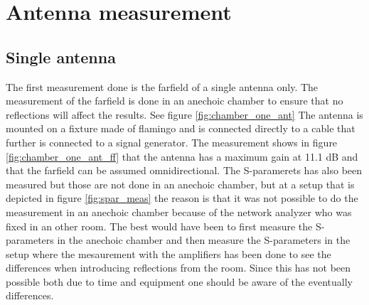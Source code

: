 \chapter{Antenna measurement}

\section{Single antenna}
The first measurement done is the farfield of a single antenna only. The measurement  of the farfield is done in an anechoic chamber to ensure that no reflections will affect the results. See figure \ref{fig:chamber_one_ant} The antenna is mounted on a fixture made of flamingo and is connected directly to a cable that further is connected to a signal generator. The measurement shows in figure \ref{fig:chamber_one_ant_ff} that the antenna has a maximum gain at 11.1 dB and that the farfield can be assumed omnidirectional. The S-paramerets has also been measured but those are not done in an anechoic chamber, but at a setup that is depicted in figure \ref{fig:spar_meas} the reason is that it was not possible to do the measurement in an anechoic chamber because of the network analyzer who was fixed in an other room. The best would have been to first measure the S-parameters in the anechoic chamber and then measure the S-parameters in the setup where the mesaurement with the amplifiers has been done to see the differences when introducing reflections from the room. Since this has not been possible both due to time and equipment one should be aware of the eventually differences.     

